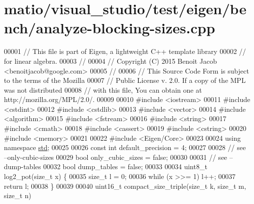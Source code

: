 \hypertarget{matio_2visual__studio_2test_2eigen_2bench_2analyze-blocking-sizes_8cpp_source}{}\section{matio/visual\+\_\+studio/test/eigen/bench/analyze-\/blocking-\/sizes.cpp}
\label{matio_2visual__studio_2test_2eigen_2bench_2analyze-blocking-sizes_8cpp_source}

\begin{DoxyCode}
00001 \textcolor{comment}{// This file is part of Eigen, a lightweight C++ template library}
00002 \textcolor{comment}{// for linear algebra.}
00003 \textcolor{comment}{//}
00004 \textcolor{comment}{// Copyright (C) 2015 Benoit Jacob <benoitjacob@google.com>}
00005 \textcolor{comment}{//}
00006 \textcolor{comment}{// This Source Code Form is subject to the terms of the Mozilla}
00007 \textcolor{comment}{// Public License v. 2.0. If a copy of the MPL was not distributed}
00008 \textcolor{comment}{// with this file, You can obtain one at http://mozilla.org/MPL/2.0/.}
00009 
00010 \textcolor{preprocessor}{#include <iostream>}
00011 \textcolor{preprocessor}{#include <cstdint>}
00012 \textcolor{preprocessor}{#include <cstdlib>}
00013 \textcolor{preprocessor}{#include <vector>}
00014 \textcolor{preprocessor}{#include <algorithm>}
00015 \textcolor{preprocessor}{#include <fstream>}
00016 \textcolor{preprocessor}{#include <string>}
00017 \textcolor{preprocessor}{#include <cmath>}
00018 \textcolor{preprocessor}{#include <cassert>}
00019 \textcolor{preprocessor}{#include <cstring>}
00020 \textcolor{preprocessor}{#include <memory>}
00021 
00022 \textcolor{preprocessor}{#include <Eigen/Core>}
00023 
00024 \textcolor{keyword}{using namespace }\hyperlink{namespacestd}{std};
00025 
00026 \textcolor{keyword}{const} \textcolor{keywordtype}{int} default\_precision = 4;
00027 
00028 \textcolor{comment}{// see --only-cubic-sizes}
00029 \textcolor{keywordtype}{bool} only\_cubic\_sizes = \textcolor{keyword}{false};
00030 
00031 \textcolor{comment}{// see --dump-tables}
00032 \textcolor{keywordtype}{bool} dump\_tables = \textcolor{keyword}{false};
00033 
00034 uint8\_t log2\_pot(\textcolor{keywordtype}{size\_t} x) \{
00035   \textcolor{keywordtype}{size\_t} l = 0;
00036   \textcolor{keywordflow}{while} (x >>= 1) l++;
00037   \textcolor{keywordflow}{return} l;
00038 \}
00039 
00040 uint16\_t compact\_size\_triple(\textcolor{keywordtype}{size\_t} k, \textcolor{keywordtype}{size\_t} m, \textcolor{keywordtype}{size\_t} n)

\end{DoxyCode}
